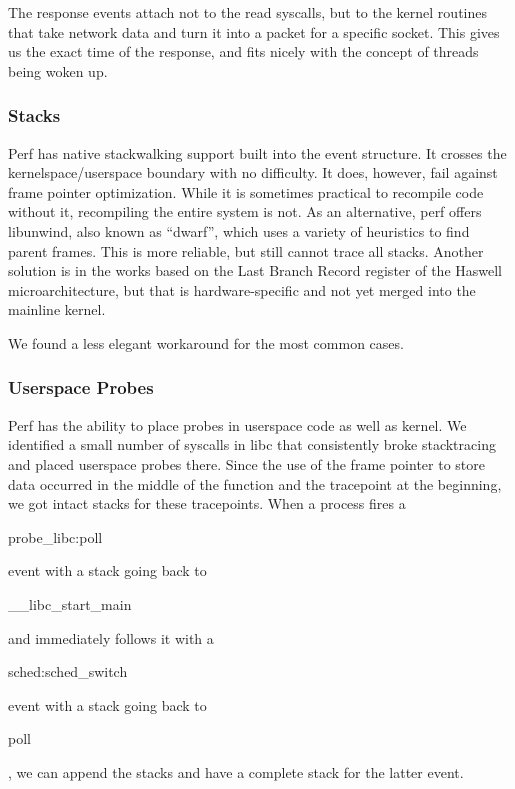 \documentclass[10pt]{article}
\begin{document}
The response events attach not to the read syscalls, but to the kernel routines that take network data and turn it into a packet for a specific socket.  This gives us the exact time of the response, and fits nicely with the concept of threads being woken up.

\subsubsection{Stacks}

Perf has native stackwalking support built into the event structure.  It crosses the kernelspace/userspace boundary with no difficulty.  It does, however, fail against frame pointer optimization.  While it is sometimes practical to recompile code without it, recompiling the entire system is not.  As an alternative, perf offers libunwind, also known as ``dwarf'', which uses a variety of heuristics to find parent frames.  This is more reliable, but still cannot trace all stacks.  Another solution is in the works based on the Last Branch Record register of the Haswell microarchitecture, but that is hardware-specific and not yet merged into the mainline kernel.

We found a less elegant workaround for the most common cases.

\subsubsection{Userspace Probes}

Perf has the ability to place probes in userspace code as well as kernel.  We identified a small number of syscalls in libc that consistently broke stacktracing and placed userspace probes there.  Since the use of the frame pointer to store data occurred in the middle of the function and the tracepoint at the beginning, we got intact stacks for these tracepoints.  When a process fires a \begin{tt}probe\_libc:poll\end{tt} event with a stack going back to \begin{tt}\_\_libc\_start\_main\end{tt} and immediately follows it with a \begin{tt}sched:sched\_switch\end{tt} event with a stack going back to \begin{tt}poll\end{tt}, we can append the stacks and have a complete stack for the latter event.
\end{document}
